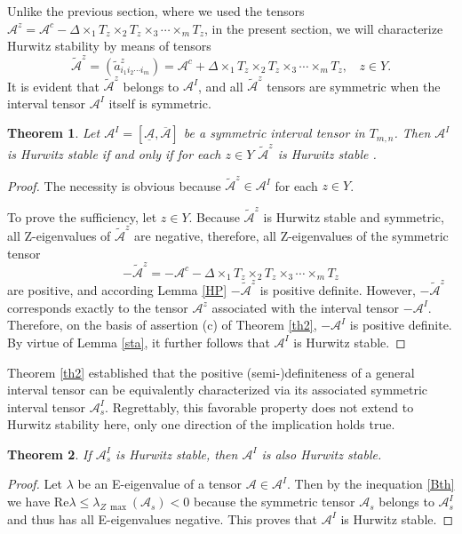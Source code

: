 \documentclass[twoside]{article}
\newtheorem{theorem}{Theorem}[section]
\begin{document}
Unlike the previous section, where we used the tensors $\mathcal{A}^z=\mathcal{A}^c-\Delta\times_1 T_z\times_2 T_z\times_3\cdots\times_m T_z$, in the present section, we will characterize Hurwitz stability by means of tensors
$$\widetilde{\mathcal{A}}^z=(\widetilde{a}^z_{i_1i_2\cdots i_m})=\mathcal{A}^c+\Delta\times_1 T_z\times_2 T_z\times_3\cdots\times_m T_z,~~~~z\in Y.$$
 It is evident that $\widetilde{\mathcal{A}}^z$ belongs to $\mathcal{A}^I$, and all $\widetilde{\mathcal{A}}^z$ tensors are symmetric when the interval tensor $\mathcal{A}^I$ itself is symmetric.
\begin{theorem}
Let $\mathcal{A}^I=[\underline{\mathcal{A}},\overline{\mathcal{A}}]$ be a symmetric interval tensor in $T_{m,n}$. Then $\mathcal{A}^I$ is Hurwitz stable if and only if for each $z\in Y$
$\widetilde{\mathcal{A}}^z$ is Hurwitz stable .
\end{theorem}
\begin{proof}
The necessity is obvious because $\widetilde{\mathcal{A}}^z\in \mathcal{A}^I$ for each $z\in Y$.

To prove the sufficiency, let $z\in Y$. Because $\widetilde{\mathcal{A}}^z$ is Hurwitz stable and symmetric, all Z-eigenvalues of $\widetilde{\mathcal{A}}^z$ are negative, therefore, all Z-eigenvalues of the symmetric tensor
$$-\widetilde{\mathcal{A}}^z =-\mathcal{A}^c- \Delta\times_1 T_z\times_2 T_z\times_3\cdots\times_m T_z$$
are positive, and according Lemma \ref{HP} $-\widetilde{\mathcal{A}}^z$ is positive definite. However, $-\widetilde{\mathcal{A}}^z$ corresponds exactly to the tensor $ \mathcal{A}^z $ associated with the interval tensor $ -\mathcal{A}^I $. Therefore, on the basis of assertion (c) of Theorem \ref{th2}, $-\mathcal{A}^I$ is positive definite. By virtue of Lemma \ref{sta}, it further follows that $ \mathcal{A}^I $ is Hurwitz stable.
\end{proof}

Theorem \ref{th2} established that the positive (semi-)definiteness of a general interval tensor can be equivalently characterized via its associated symmetric interval tensor  $\mathcal{A}_s^I$. Regrettably, this favorable property does not extend to Hurwitz stability here, only one direction of the implication holds true.

\begin{theorem}
If $\mathcal{A}_s^I$ is Hurwitz stable, then $\mathcal{A}^I$ is also Hurwitz stable.
\end{theorem}
\begin{proof}
Let $\lambda$ be an E-eigenvalue of a tensor $\mathcal{A}\in \mathcal{A}^I$. Then by the inequation \eqref{Bth} we have Re$\lambda\leq \lambda_{Z~\max}(\mathcal{A}_s) < 0$ because the symmetric tensor $\mathcal{A}_s$ belongs to $\mathcal{A}^I_s$ and thus has all E-eigenvalues negative. This proves that $\mathcal{A}^I$ is Hurwitz stable.
\end{proof}
\end{document}
